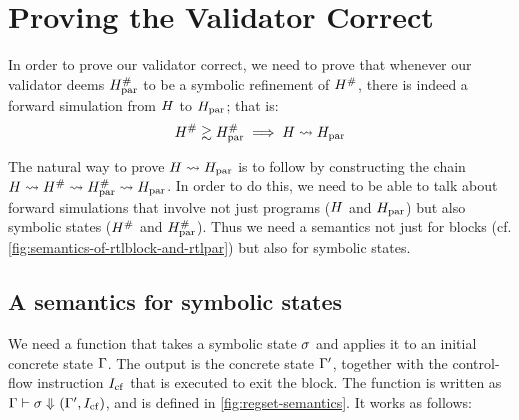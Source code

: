 {\section{Proving the Validator Correct}%
\label{sec:overview-validator-correctness-proof}

In order to prove our validator correct, we need to prove that whenever our validator deems $H_\text{par}^{\#}$ to be a symbolic refinement of $H^{\#}$, there is indeed a forward simulation from $H$ to $H_\text{par}$; that is:
  \begin{equation}
    H^{\#} \gtrsim H_\text{par}^{\#} \implies H \mathrel{\leadsto} H_\text{par}
  \end{equation}

The natural way to prove $H \mathrel{\leadsto} H_\text{par}$ is to follow \textcite{tristan08_formal_verif_trans_valid} by constructing the chain $H \mathrel{\leadsto} H^{\#} \mathrel{\leadsto} H_\text{par}^{\#} \mathrel{\leadsto} H_\text{par}$. In order to do this, we need to be able to talk about forward simulations that involve not just programs ($H$ and $H_\text{par}$) but also symbolic states ($H^{\#}$ and $H_\text{par}^{\#}$). Thus we need a semantics not just for blocks (cf. \cref{fig:semantics-of-rtlblock-and-rtlpar}) but also for symbolic states.

\subsection{A semantics for symbolic states}

We need a function that takes a symbolic state $\sigma$ and applies it to an initial concrete state $\Gamma$. The output is the concrete state $\Gamma'$, together with the control-flow instruction $I_{\mathrm{cf}}$ that is executed to exit the block. The function is written as $\Gamma \vdash \sigma \Downarrow_{} (\Gamma',I_{\mathrm{cf}})$, and is defined in \cref{fig:regset-semantics}. It works as follows:


}

